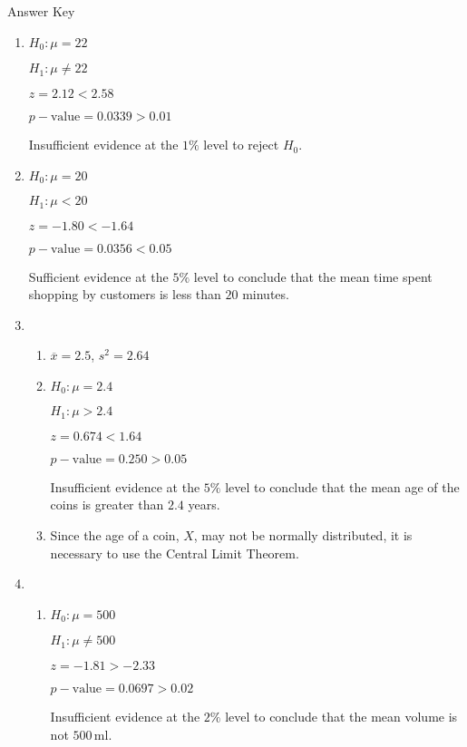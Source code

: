 \documentclass[11pt,a4paper]{book}
\begin{document}
\newpage

\begin{assignment}{Answer Key}

\begin{enumerate}

\item $H_{0}:\mu=22$

$H_{1}:\mu\neq22$

$z=2.12<2.58$

$p-\text{value}=0.0339>0.01$

Insufficient evidence at the $1\%$ level to reject $H_{0}$.

\item $H_{0}:\mu=20$

$H_{1}:\mu<20$

$z=-1.80<-1.64$

$p-\text{value}=0.0356<0.05$

Sufficient evidence at the $5\%$ level to conclude that the mean
time spent shopping by customers is less than $20$ minutes.


\item 
\begin{enumerate}[label=(\alph*)] 

\item $\overline{x}=2.5$, $s^{2}=2.64$

\item $H_{0}:\mu=2.4$

$H_{1}:\mu>2.4$

$z=0.674<1.64$

$p-\text{value}=0.250>0.05$

Insufficient evidence at the $5\%$ level to conclude that the mean
age of the coins is greater than $2.4$ years.

\item Since the age of a coin, $X$, may not be normally distributed, it
is necessary to use the Central Limit Theorem.

\end{enumerate}

\item
\begin{enumerate}[label=(\alph*)] 

\item $H_{0}:\mu=500$

$H_{1}:\mu\neq500$

$z=-1.81>-2.33$

$p-\text{value}=0.0697>0.02$

Insufficient evidence at the $2\%$ level to conclude that the mean
volume is not $500\,\text{ml}$.


\end{enumerate}
\end{enumerate}
\end{assignment}
\end{document}
